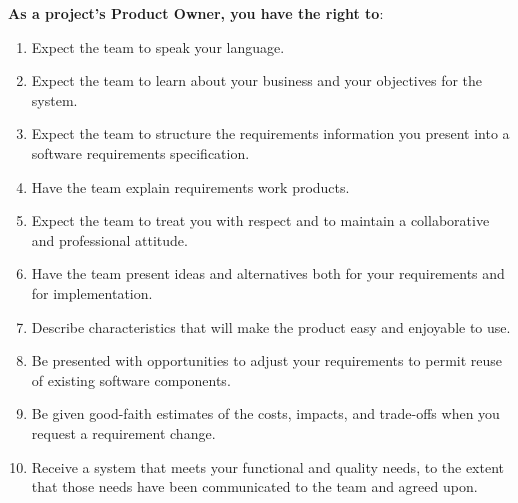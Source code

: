 

{\bfseries As a project's Product Owner, you have the right to}:
\begin{enumerate}[itemsep = 0.25em]
    \item Expect the team to speak your language.
    \item Expect the team to learn about your business and your objectives for
          the system.
    \item Expect the team to structure the requirements information you present
          into a software requirements specification.
    \item Have the team explain requirements work products.
    \item Expect the team to treat you with respect and to maintain a
          collaborative and professional attitude.
    \item Have the team present ideas and alternatives both for your
          requirements and for implementation.
    \item Describe characteristics that will make the product easy and enjoyable
          to use.
    \item Be presented with opportunities to adjust your requirements to permit
          reuse of existing software components.
    \item Be given good-faith estimates of the costs, impacts, and trade-offs
          when you request a requirement change.
    \item Receive a system that meets your functional and quality needs, to the
          extent that those needs have been communicated to the team and agreed
          upon.
\end{enumerate}
